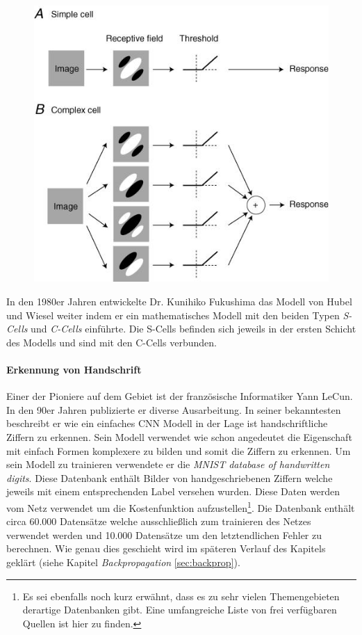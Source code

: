 \begin{figure}[!htb]
	\centering
	\includegraphics[width=.6\linewidth]{img/simpleVsComplex}
	\label{fig:simpleVsComplex}
\end{figure}

In den 1980er Jahren entwickelte Dr. Kunihiko Fukushima das Modell von Hubel und Wiesel weiter indem er ein mathematisches Modell mit den beiden Typen \emph{S-Cells} und \emph{C-Cells} einführte. Die S-Cells befinden sich jeweils in der ersten Schicht des Modells und sind mit den C-Cells verbunden. 

\paragraph{Erkennung von Handschrift}
Einer der Pioniere auf dem Gebiet ist der französische Informatiker Yann LeCun. In den 90er Jahren publizierte er diverse Ausarbeitung. In seiner bekanntesten beschreibt er wie ein einfaches CNN Modell in der Lage ist handschriftliche Ziffern zu erkennen. Sein Modell verwendet wie schon angedeutet die Eigenschaft mit einfach Formen komplexere zu bilden und somit die Ziffern zu erkennen. Um sein Modell zu trainieren verwendete er die \emph{MNIST database of handwritten digits}. Diese Datenbank enthält Bilder von handgeschriebenen Ziffern welche jeweils mit einem entsprechenden Label versehen wurden. Diese Daten werden vom Netz verwendet um die Kostenfunktion aufzustellen\footnote{Es sei ebenfalls noch kurz erwähnt, dass es zu sehr vielen Themengebieten derartige Datenbanken gibt. Eine umfangreiche Liste von frei verfügbaren Quellen ist hier \cite{openDataSets} zu finden.}. Die Datenbank enthält circa 60.000 Datensätze welche ausschließlich zum trainieren des Netzes verwendet werden und 10.000 Datensätze um den letztendlichen Fehler zu berechnen. Wie genau dies geschieht wird im späteren Verlauf des Kapitels geklärt (siehe Kapitel \emph{Backpropagation} \ref{sec:backprop}).

